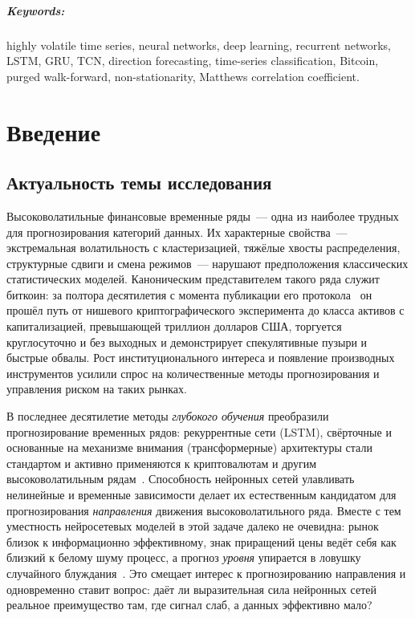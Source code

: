 \documentclass[12pt,a4paper]{report}
\begin{document}
\paragraph{Keywords:} highly volatile time series, neural networks, deep learning,
recurrent networks, LSTM, GRU, TCN, direction forecasting, time-series
classification, Bitcoin, purged walk-forward, non-stationarity, Matthews
correlation coefficient.

\chapter*{Введение}

\section*{Актуальность темы исследования}

Высоковолатильные финансовые временные ряды~--- одна из наиболее трудных для
прогнозирования категорий данных. Их характерные свойства~--- экстремальная
волатильность с кластеризацией, тяжёлые хвосты распределения, структурные сдвиги и
смена режимов~--- нарушают предположения классических статистических моделей.
Каноническим представителем такого ряда служит биткоин: за полтора десятилетия с
момента публикации его протокола~\cite{nakamoto2008} он прошёл путь от нишевого
криптографического эксперимента до класса активов с капитализацией, превышающей
триллион долларов США, торгуется круглосуточно и без выходных и демонстрирует
спекулятивные пузыри и быстрые обвалы. Рост институционального интереса и появление
производных инструментов усилили спрос на количественные методы прогнозирования и
управления риском на таких рынках.

В последнее десятилетие методы \emph{глубокого обучения} преобразили
прогнозирование временных рядов: рекуррентные сети (LSTM), свёрточные и
основанные на механизме внимания (трансформерные) архитектуры стали стандартом и
активно применяются к криптовалютам и другим высоковолатильным
рядам~\cite{ji2019, livieris2020, kim2022, dashtaki2025, wu2024, labbaf2024}.
Способность нейронных сетей улавливать нелинейные и временные зависимости делает их
естественным кандидатом для прогнозирования \emph{направления} движения
высоковолатильного ряда. Вместе с тем уместность нейросетевых моделей в этой задаче
далеко не очевидна: рынок близок к информационно эффективному, знак приращений цены
ведёт себя как близкий к белому шуму процесс, а прогноз \emph{уровня} упирается в
ловушку случайного блуждания~\cite{fama1970, lo1988}. Это смещает интерес к
прогнозированию направления и одновременно ставит вопрос: даёт ли выразительная
сила нейронных сетей реальное преимущество там, где сигнал слаб, а данных
эффективно мало?
\end{document}
